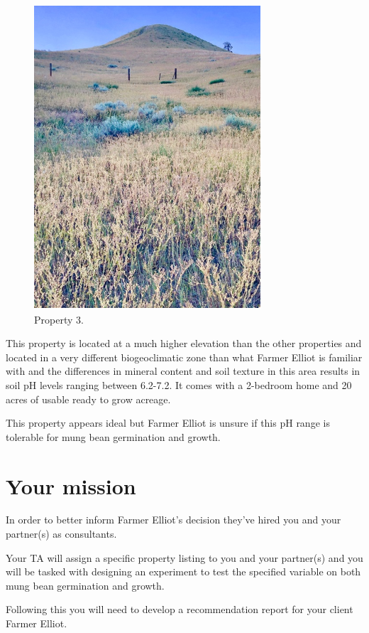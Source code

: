 \documentclass[
]{book}
\begin{document}
\begin{figure}
\centering
\includegraphics{images/prop-3.png}
\caption{Property 3.}
\end{figure}

This property is located at a much higher elevation than the other properties and located in a very different biogeoclimatic zone than what Farmer Elliot is familiar with and the differences in mineral content and soil texture in this area results in soil pH levels ranging between 6.2-7.2. It comes with a 2-bedroom home and 20 acres of usable ready to grow acreage.

This property appears ideal but Farmer Elliot is unsure if this pH range is tolerable for mung bean germination and growth.

\hypertarget{your-mission}{%
\section*{Your mission}\label{your-mission}}

In order to better inform Farmer Elliot's decision they've hired you and your partner(s) as consultants.

Your TA will assign a specific property listing to you and your partner(s) and you will be tasked with designing an experiment to test the specified variable on both mung bean germination and growth.

Following this you will need to develop a recommendation report for your client Farmer Elliot.
\end{document}
